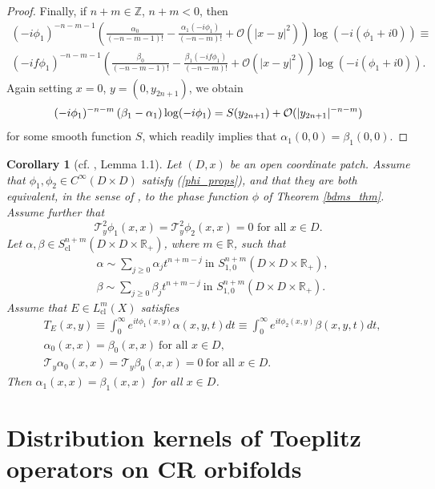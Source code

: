 \documentclass{article}
\newtheorem{corollary}[theorem]{Corollary}
\newcommand{\RR}{\mathbb R}
\newcommand{\ZZ}{\mathbb Z}
\newcommand{\mct}{\mathcal T}
\newcommand{\mco}{\mathcal O}
\DeclareMathOperator{\cl}{cl}
\begin{document}
\begin{proof}
Finally, if $n+m \in \ZZ$, $n+m < 0$, then \begin{multline*} (-i\phi_1)^{-n-m-1} \left(\frac{\alpha_0}{(-n-m-1)!}  - \frac{\alpha_1(-i\phi_1)}{(-n-m)!}  + \mco(|x-y|^2)\right)\log(-i(\phi_1+i0))  \equiv \\ (-if \phi_1)^{-n-m-1}\left(\frac{\beta_0}{(-n-m-1)!} - \frac{\beta_1(-if \phi_1)}{(-n-m)!} + \mco(|x-y|^2)\right)\log(-i(\phi_1+i0)).\end{multline*}
Again setting $x = 0$, $y = (0, y_{2n+1})$, we obtain $$(-i\phi_1)^{-n-m}\left(\beta_1 - \alpha_1\right)\log(-i \phi_1) \\=S(y_{2n+1})+ \mco(|y_{2n+1}|^{-n-m})$$
for some smooth function $S$, which readily implies that $\alpha_1(0,0) = \beta_1(0,0)$.
\end{proof}
%
%
\begin{corollary}[cf. \cite{hsiao_shen}, Lemma 1.1]\label{uniqueness_corollary} Let $(D,x)$ be an open coordinate patch. Assume that $\phi_1, \phi_2 \in C^\infty(D \times D)$ satisfy (\ref{phi_props}), and that they are both equivalent, in the sense of \cite{ms}, to the phase function $\phi$ of Theorem \ref{bdms_thm}. Assume further that $$\mct^2_y \phi_1(x,x) = \mct^2_y \phi_2(x,x) = 0\text{ for all }x\in D.$$
Let $\alpha, \beta \in S^{n+m}_{\cl}(D \times D \times \RR_+)$, where $m \in \RR$, such that $$\begin{aligned} &\alpha \sim \sum_{j \ge 0} \alpha_j t^{n+m-j}\ \text{in } S^{n+m}_{1,0}(D \times D \times \RR_+),\\ &\beta \sim \sum_{j \ge 0} \beta_j t^{n+m-j}\ \text{in } S^{n+m}_{1,0}(D \times D \times \RR_+). \end{aligned}$$
Assume that $E\in L^m_{\cl}(X)$ satisfies $$\begin{aligned} &T_E(x,y) \equiv \int_0^\infty e^{it \phi_1(x,y)} \alpha(x,y,t) dt \equiv \int_0^\infty e^{it \phi_2(x,y)} \beta(x,y,t) dt,\\ &\alpha_0(x,x) = \beta_0(x,x)\ \text{for all }x \in D,\\ &\mct_y \alpha_0(x,x) = \mct_y \beta_0(x,x) = 0\ \text{for all }x \in D. \end{aligned}$$
Then $\alpha_1(x,x) = \beta_1(x,x)$ for all $x \in D$.\end{corollary}
%
%
\section{Distribution kernels of Toeplitz operators on CR orbifolds}\label{s-gue251129yyd}
\end{document}
